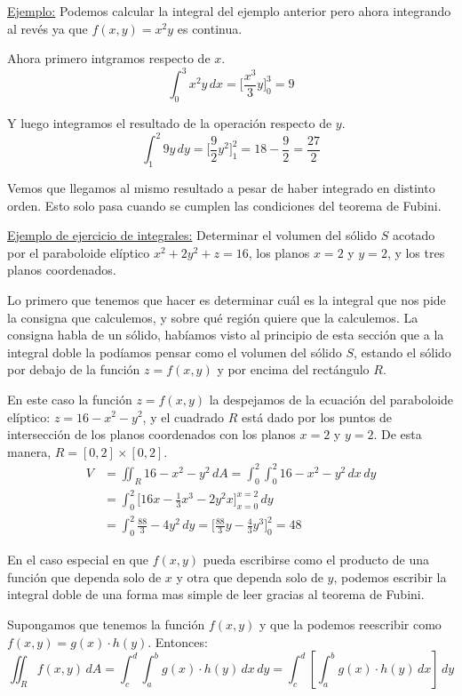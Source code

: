 \documentclass[12pt]{article}
\begin{document}
\underline{Ejemplo:} Podemos calcular la integral del ejemplo anterior pero ahora integrando al revés ya que $ f(x,y)=x^2y $ es continua.

Ahora primero intgramos respecto de $ x $.
\[
  \int_{0}^{3} x^2y \,dx = \Bigg[\frac{x^3}{3}y\Bigg]_{0}^{3} = 9
\]

Y luego integramos el resultado de la operación respecto de $ y $.
\[
  \int_{1}^{2} 9y \,dy = \Bigg[\frac{9}{2}y^2\Bigg]_{1}^{2} = 18 - \frac{9}{2} = \frac{27}{2}
\]

Vemos que llegamos al mismo resultado a pesar de haber integrado en distinto orden. Esto solo pasa cuando se cumplen las condiciones del teorema de Fubini.

\underline{Ejemplo de ejercicio de integrales:} Determinar el volumen del sólido $ S $ acotado por el paraboloide elíptico $ x^2+2y^2+z=16 $, los planos $ x=2 $ y $ y=2 $, y los tres planos coordenados.

Lo primero que tenemos que hacer es determinar cuál es la integral que nos pide la consigna que calculemos, y sobre qué región quiere que la calculemos. La consigna habla de un sólido, habíamos visto al principio de esta sección que a la integral doble la podíamos pensar como el volumen del sólido $ S $, estando el sólido por debajo de la función $ z = f(x,y) $ y por encima del rectángulo $ R $.

En este caso la función $ z=f(x,y) $ la despejamos de la ecuación del paraboloide elíptico: $ z = 16-x^2-y^2 $, y el cuadrado $ R $ está dado por los puntos de intersección de los planos coordenados con los planos $ x=2 $ y $ y=2 $. De esta manera, $ R=\left[0,2\right]\times \left[0,2\right] $.
\begin{align*}
  V &= \iint_{R} 16-x^2-y^2 \,dA = \int_{0}^{2} \int_{0}^{2} 16-x^2-y^2 \,dx\,dy\\
   &= \int_{0}^{2} \Bigg[16x-\frac{1}{3}x^3-2y^2x\Bigg]_{x=0}^{x=2} \,dy\\
   &= \int_{0}^{2} \frac{88}{3}-4y^2 \,dy = \Bigg[\frac{88}{3}y-\frac{4}{3}y^3\Bigg]_{0}^{2}=48
\end{align*}

En el caso especial en que $ f(x,y) $ pueda escribirse como el producto de una función que dependa solo de $ x $ y otra que dependa solo de $ y $, podemos escribir la integral doble de una forma mas simple de leer gracias al teorema de Fubini.

Supongamos que tenemos la función $ f(x,y) $ y que la podemos reescribir como $ f(x,y)=g(x)\cdot h(y) $. Entonces:
\[
  \iint_{R} f(x,y) \,dA = \int_{c}^{d} \int_{a}^{b} g(x)\cdot h(y) \,dx\,dy = \int_{c}^{d} \left[\int_{a}^{b} g(x)\cdot h(y) \,dx\right] \,dy
\]
\end{document}
